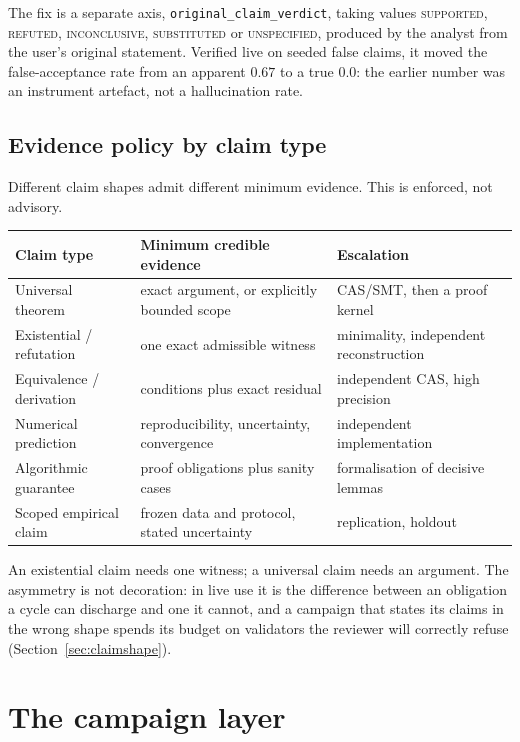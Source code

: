 \documentclass[11pt,a4paper]{article}
\newcommand{\code}[1]{\texttt{\small #1}}
\begin{document}
The fix is a separate axis, \code{original\_claim\_verdict}, taking values
\textsc{supported}, \textsc{refuted}, \textsc{inconclusive},
\textsc{substituted} or \textsc{unspecified}, produced by the analyst from the
user's original statement. Verified live on seeded false claims, it moved the
false-acceptance rate from an apparent $0.67$ to a true $0.0$: the earlier
number was an instrument artefact, not a hallucination rate.

\subsection{Evidence policy by claim type}

Different claim shapes admit different minimum evidence. This is enforced, not
advisory.

\begin{center}
\small
\begin{tabular}{@{}p{3.6cm}p{5.6cm}p{5.2cm}@{}}
\toprule
\textbf{Claim type} & \textbf{Minimum credible evidence} & \textbf{Escalation} \\
\midrule
Universal theorem & exact argument, or explicitly bounded scope & CAS/SMT, then a proof kernel \\
Existential / refutation & one exact admissible witness & minimality, independent reconstruction \\
Equivalence / derivation & conditions plus exact residual & independent CAS, high precision \\
Numerical prediction & reproducibility, uncertainty, convergence & independent implementation \\
Algorithmic guarantee & proof obligations plus sanity cases & formalisation of decisive lemmas \\
Scoped empirical claim & frozen data and protocol, stated uncertainty & replication, holdout \\
\bottomrule
\end{tabular}
\end{center}

An existential claim needs one witness; a universal claim needs an argument.
The asymmetry is not decoration: in live use it is the difference between an
obligation a cycle can discharge and one it cannot, and a campaign that states
its claims in the wrong shape spends its budget on validators the reviewer will
correctly refuse (Section~\ref{sec:claimshape}).

\section{The campaign layer}
\label{sec:campaign}
\end{document}
